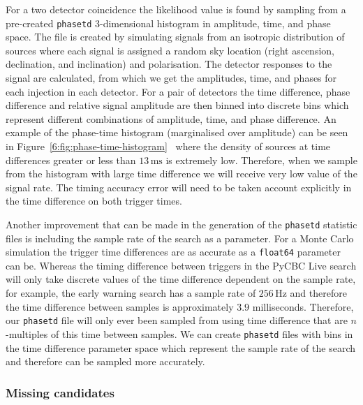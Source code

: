 For a two detector coincidence the likelihood value is found by sampling from a pre-created \texttt{phasetd} 3-dimensional histogram in amplitude, time, and phase space. The file is created by simulating \gwadj signals from an isotropic distribution of sources where each signal is assigned a random sky location (right ascension, declination, and inclination) and polarisation. The detector responses to the signal are calculated, from which we get the amplitudes, time, and phases for each injection in each detector. For a pair of detectors the time difference, phase difference and relative signal amplitude are then binned into discrete bins which represent different combinations of amplitude, time, and phase difference. An example of the phase-time histogram (marginalised over amplitude) can be seen in Figure~\ref{6:fig:phase-time-histogram}~\cite{PyCBC:2017} where the density of sources at time differences greater or less than $13 \, \text{ms}$ is extremely low. Therefore, when we sample from the histogram with large time difference we will receive very low value of the signal rate. The timing accuracy error will need to be taken account explicitly in the time difference on both trigger times.

Another improvement that can be made in the generation of the \texttt{phasetd} statistic files is including the sample rate of the search as a parameter. For a Monte Carlo simulation the trigger time differences are as accurate as a \texttt{float64} parameter can be. Whereas the timing difference between triggers in the PyCBC Live search will only take discrete values of the time difference dependent on the sample rate, for example, the early warning search has a sample rate of $256 \, \text{Hz}$ and therefore the time difference between samples is approximately $3.9$ milliseconds. Therefore, our \texttt{phasetd} file will only ever been sampled from using time difference that are $n$-multiples of this time between samples. We can create \texttt{phasetd} files with bins in the time difference parameter space which represent the sample rate of the search and therefore can be sampled more accurately.

\subsubsection{\label{6:sec:missing-cands}Missing candidates}

